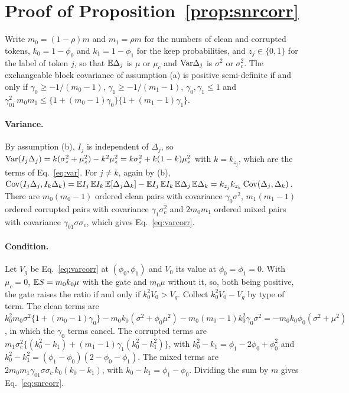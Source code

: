 \section{Proof of Proposition~\ref{prop:snrcorr}}\label{app:snrcorr}
Write $m_0=(1-\rho)m$ and $m_1=\rho m$ for the numbers of clean and corrupted tokens, $k_0=1-\phi_0$ and $k_1=1-\phi_1$ for the keep
probabilities, and $z_j\in\{0,1\}$ for the label of token $j$, so that $\mathbb{E}\Delta_j$ is $\mu$ or $\mu_c$ and $\mathrm{Var}\Delta_j$ is $\sigma^2$ or
$\sigma_c^2$.
The exchangeable block covariance of assumption (a) is positive semi-definite if and only if $\gamma_0\ge-1/(m_0-1)$,
$\gamma_1\ge-1/(m_1-1)$, $\gamma_0,\gamma_1\le1$ and $\gamma_{01}^2\,m_0m_1\le\{1+(m_0-1)\gamma_0\}\{1+(m_1-1)\gamma_1\}$.

\paragraph{Variance.}
By assumption (b), $I_j$ is independent of $\Delta_j$, so
$\mathrm{Var}(I_j\Delta_j)=k(\sigma_z^2+\mu_z^2)-k^2\mu_z^2=k\sigma_z^2+k(1-k)\mu_z^2$ with $k=k_{z_j}$, which are the terms of Eq.~\eqref{eq:var}.
For $j\neq k$, again by (b),
$\mathrm{Cov}(I_j\Delta_j,I_k\Delta_k)=\mathbb{E} I_j\,\mathbb{E} I_k\,\mathbb{E}[\Delta_j\Delta_k]-\mathbb{E} I_j\,\mathbb{E} I_k\,\mathbb{E}\Delta_j\,\mathbb{E}\Delta_k=k_{z_j}k_{z_k}\,\mathrm{Cov}(\Delta_j,\Delta_k)$.
There are $m_0(m_0-1)$ ordered clean pairs with covariance $\gamma_0\sigma^2$, $m_1(m_1-1)$ ordered corrupted pairs with covariance
$\gamma_1\sigma_c^2$ and $2m_0m_1$ ordered mixed pairs with covariance $\gamma_{01}\sigma\sigma_c$, which gives Eq.~\eqref{eq:varcorr}.

\paragraph{Condition.}
Let $V_g$ be Eq.~\eqref{eq:varcorr} at $(\phi_0,\phi_1)$ and $V_0$ its value at $\phi_0=\phi_1=0$.
With $\mu_c=0$, $\mathbb{E} S=m_0k_0\mu$ with the gate and $m_0\mu$ without it, so, both being positive, the gate raises the ratio if and only if
$k_0^2V_0>V_g$.
Collect $k_0^2V_0-V_g$ by type of term.
The clean terms are
$k_0^2m_0\sigma^2\{1+(m_0-1)\gamma_0\}-m_0k_0(\sigma^2+\phi_0\mu^2)-m_0(m_0-1)k_0^2\gamma_0\sigma^2=-m_0k_0\phi_0(\sigma^2+\mu^2)$,
in which the $\gamma_0$ terms cancel.
The corrupted terms are $m_1\sigma_c^2\{(k_0^2-k_1)+(m_1-1)\gamma_1(k_0^2-k_1^2)\}$, with $k_0^2-k_1=\phi_1-2\phi_0+\phi_0^2$ and
$k_0^2-k_1^2=(\phi_1-\phi_0)(2-\phi_0-\phi_1)$.
The mixed terms are $2m_0m_1\gamma_{01}\sigma\sigma_c\,k_0(k_0-k_1)$, with $k_0-k_1=\phi_1-\phi_0$.
Dividing the sum by $m$ gives Eq.~\eqref{eq:snrcorr}.


